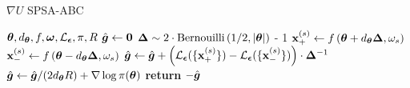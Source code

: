 \begin{algorithm}[t]
	\caption{$\nabla U$ SPSA-ABC}\label{algo:spsa}
	\begin{algorithmic}
		 ${\bm \theta}, d_{{\bm \theta}}, f, {\bm \omega}, \mathcal{L}_{{\bm {\epsilon}}}, \pi, R$ 
		\STATE $\hat{{\bm g }} \leftarrow {\bm 0}$
        \STATE ${\bm \Delta} \sim 2 \cdot \text{Bernouilli}\left( 1/2, |{\bm \theta}| \right)$ - 1
          \STATE ${\bf x}^{(s)}_{+} \leftarrow f\left( {\bm \theta} + d_{{\bm \theta}} {\bm \Delta}, \omega_s \right)$
          \STATE ${\bf x}^{(s)}_{-} \leftarrow f\left( {\bm \theta} - d_{{\bm \theta}} {\bm \Delta}, \omega_s \right)$
        \ENDFOR
        \STATE $\hat{{\bm g }} \leftarrow \hat{{\bm g }} + \left( \mathcal{L}_{{\bm {\epsilon}}}( \{{\bf x}^{(s)}_{+}\}) - \mathcal{L}_{{\bm {\epsilon}}}( \{{\bf x}^{(s)}_{-}\}) \right) \cdot {\bm \Delta}^{-1}$
			\ENDFOR
    \STATE $\hat{{\bm g }} \leftarrow \hat{{\bm g }}/(2d_{{\bm \theta}} R) + \nabla \log \pi({\bm \theta})$
		\STATE \textbf{return} $-\hat{{\bm g }}$
	\end{algorithmic}
\end{algorithm}